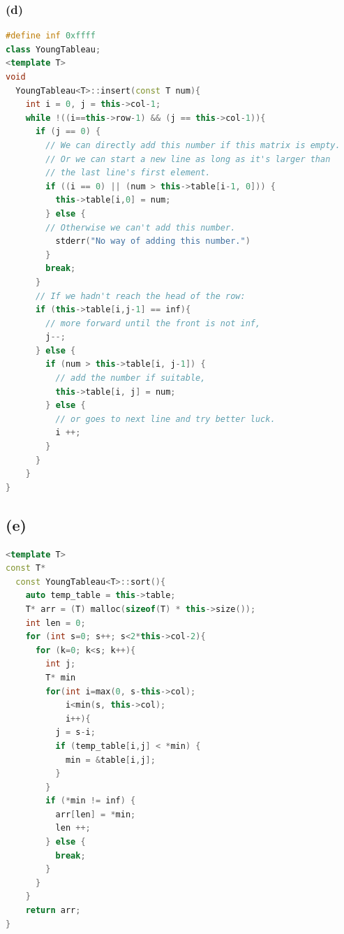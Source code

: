 \documentclass{article}
\begin{document}
  \subsubsection*{(d)}    
\begin{lstlisting}[language = C++]
#define inf 0xffff
class YoungTableau;
<template T>
void 
  YoungTableau<T>::insert(const T num){
    int i = 0, j = this->col-1;
    while !((i==this->row-1) && (j == this->col-1)){
      if (j == 0) {
        // We can directly add this number if this matrix is empty.
        // Or we can start a new line as long as it's larger than 
        // the last line's first element.
        if ((i == 0) || (num > this->table[i-1, 0])) {
          this->table[i,0] = num;
        } else {
        // Otherwise we can't add this number.
          stderr("No way of adding this number.")   
        }
        break;
      }
      // If we hadn't reach the head of the row:
      if (this->table[i,j-1] == inf){
        // more forward until the front is not inf,
        j--;
      } else {
        if (num > this->table[i, j-1]) {
          // add the number if suitable,
          this->table[i, j] = num;
        } else {
          // or goes to next line and try better luck.
          i ++;
        }
      }
    }
}
\end{lstlisting}
  \subsection*{(e)}
\begin{lstlisting}[language = C++]
<template T>
const T* 
  const YoungTableau<T>::sort(){
    auto temp_table = this->table;
    T* arr = (T) malloc(sizeof(T) * this->size());
    int len = 0;
    for (int s=0; s++; s<2*this->col-2){
      for (k=0; k<s; k++){
        int j;
        T* min
        for(int i=max(0, s-this->col); 
            i<min(s, this->col); 
            i++){
          j = s-i;
          if (temp_table[i,j] < *min) {
            min = &table[i,j];
          }
        }
        if (*min != inf) {
          arr[len] = *min;
          len ++;
        } else {
          break;
        }
      }
    }
    return arr;
}
\end{lstlisting}
\end{document}
